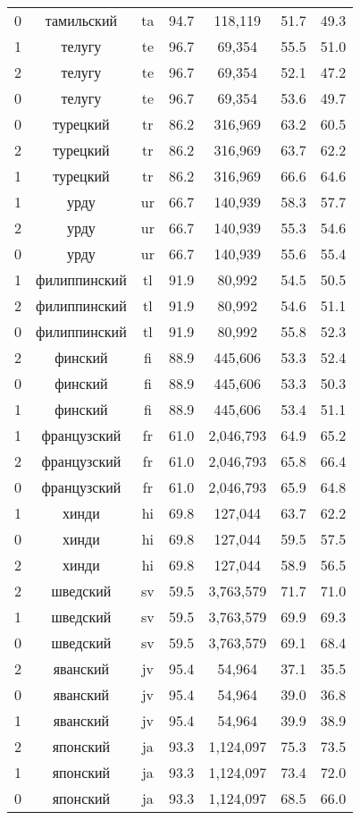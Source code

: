\begin{table*}
{\begin{tabular}{|c|c|c|c||c|c|c|}
0 & тамильский & ta & 94.7 & 118,119 & 51.7 & 49.3\\
1 & телугу & te & 96.7 & 69,354 & 55.5 & 51.0\\
2 & телугу & te & 96.7 & 69,354 & 52.1 & 47.2\\
0 & телугу & te & 96.7 & 69,354 & 53.6 & 49.7\\
0 & турецкий & tr & 86.2 & 316,969 & 63.2 & 60.5\\
2 & турецкий & tr & 86.2 & 316,969 & 63.7 & 62.2\\
1 & турецкий & tr & 86.2 & 316,969 & 66.6 & 64.6\\
1 & урду & ur & 66.7 & 140,939 & 58.3 & 57.7\\
2 & урду & ur & 66.7 & 140,939 & 55.3 & 54.6\\
0 & урду & ur & 66.7 & 140,939 & 55.6 & 55.4\\
1 & филиппинский & tl & 91.9 & 80,992 & 54.5 & 50.5\\
2 & филиппинский & tl & 91.9 & 80,992 & 54.6 & 51.1\\
0 & филиппинский & tl & 91.9 & 80,992 & 55.8 & 52.3\\
2 & финский & fi & 88.9 & 445,606 & 53.3 & 52.4\\
0 & финский & fi & 88.9 & 445,606 & 53.3 & 50.3\\
1 & финский & fi & 88.9 & 445,606 & 53.4 & 51.1\\
1 & французский & fr & 61.0 & 2,046,793 & 64.9 & 65.2\\
2 & французский & fr & 61.0 & 2,046,793 & 65.8 & 66.4\\
0 & французский & fr & 61.0 & 2,046,793 & 65.9 & 64.8\\
1 & хинди & hi & 69.8 & 127,044 & 63.7 & 62.2\\
0 & хинди & hi & 69.8 & 127,044 & 59.5 & 57.5\\
2 & хинди & hi & 69.8 & 127,044 & 58.9 & 56.5\\
2 & шведский & sv & 59.5 & 3,763,579 & 71.7 & 71.0\\
1 & шведский & sv & 59.5 & 3,763,579 & 69.9 & 69.3\\
0 & шведский & sv & 59.5 & 3,763,579 & 69.1 & 68.4\\
2 & яванский & jv & 95.4 & 54,964 & 37.1 & 35.5\\
0 & яванский & jv & 95.4 & 54,964 & 39.0 & 36.8\\
1 & яванский & jv & 95.4 & 54,964 & 39.9 & 38.9\\
2 & японский & ja & 93.3 & 1,124,097 & 75.3 & 73.5\\
1 & японский & ja & 93.3 & 1,124,097 & 73.4 & 72.0\\
0 & японский & ja & 93.3 & 1,124,097 & 68.5 & 66.0\\
\end{tabular}
}
\end{table*}




